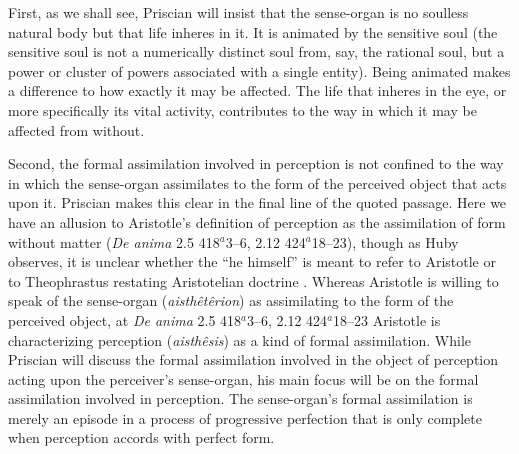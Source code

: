 \documentclass[12pt]{article}
\begin{document}
First, as we shall see, Priscian will insist that the sense-organ is no soulless natural body but that life inheres in it. It is animated by the sensitive soul (the sensitive soul is not a numerically distinct soul from, say, the rational soul, but a power or cluster of powers associated with a single entity). Being animated makes a difference to how exactly it may be affected. The life that inheres in the eye, or more specifically its vital activity, contributes to the way in which it may be affected from without.

Second, the formal assimilation involved in perception is not confined to the way in which the sense-organ assimilates to the form of the perceived object that acts upon it. Priscian makes this clear in the final line of the quoted passage. Here we have an allusion to Aristotle's definition of perception as the assimilation of form without matter (\emph{De anima} 2.5 418\( ^{a} \)3--6, 2.12 424\( ^{a} \)18--23), though as Huby observes, it is unclear whether the ``he himself'' is meant to refer to Aristotle or to Theophrastus restating Aristotelian doctrine \citep[49--50 n11]{Sorabji:1997ly}. Whereas Aristotle is willing to speak of the sense-organ (\emph{aisthêtêrion}) as assimilating to the form of the perceived object, at \emph{De anima} 2.5 418\( ^{a} \)3--6, 2.12 424\( ^{a} \)18--23 Aristotle is characterizing perception (\emph{aisthêsis}) as a kind of formal assimilation. While Priscian will discuss the formal assimilation involved in the object of perception acting upon the perceiver's sense-organ, his main focus will be on the formal assimilation involved in perception. The sense-organ's formal assimilation is merely an episode in a process of progressive perfection that is only complete when perception accords with perfect form.
\end{document}
